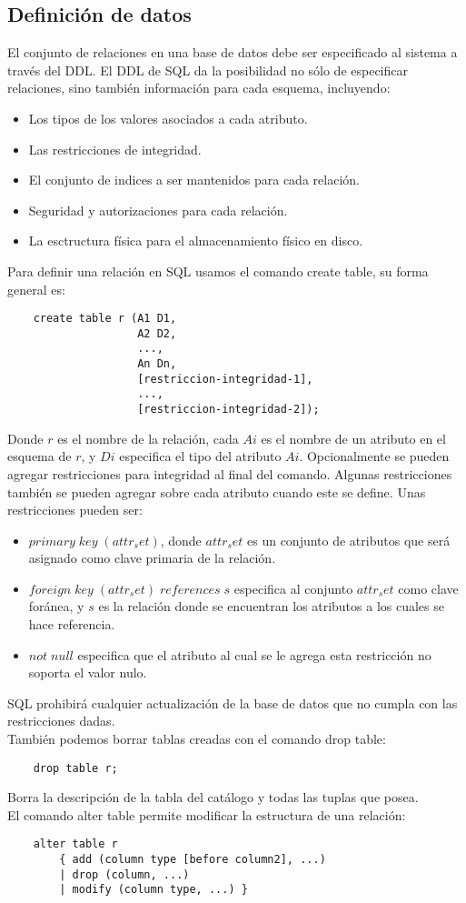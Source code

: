 \documentclass[a4paper]{article}
\begin{document}
\subsection{Definici\'on de datos}
El conjunto de relaciones en una base de datos debe ser especificado al sistema a trav\'es del
DDL. El DDL de SQL da la posibilidad no s\'olo de especificar relaciones, sino tambi\'en
informaci\'on para cada esquema, incluyendo:
\begin{itemize}
    \item Los tipos de los valores asociados a cada atributo.
    \item Las restricciones de integridad.
    \item El conjunto de indices a ser mantenidos para cada relaci\'on.
    \item Seguridad y autorizaciones para cada relaci\'on.
    \item La esctructura f\'isica para el almacenamiento f\'isico en disco.
\end{itemize}
Para definir una relaci\'on en SQL usamos el comando create table, su forma general es:
\begin{lstlisting}
    create table r (A1 D1,
                    A2 D2,
                    ...,
                    An Dn,
                    [restriccion-integridad-1],
                    ...,
                    [restriccion-integridad-2]);
\end{lstlisting}
Donde $r$ es el nombre de la relaci\'on, cada $Ai$ es el nombre de un atributo en el esquema 
de $r$, y $Di$ especifica el tipo del atributo $Ai$. Opcionalmente se pueden agregar
restricciones para integridad al final del comando. Algunas restricciones tambi\'en se pueden
agregar sobre cada atributo cuando este se define. Unas restricciones pueden ser:
\begin{itemize}
    \item $primary\; key\; (attr_set)$, donde $attr_set$ es un conjunto de atributos que ser\'a
    asignado como clave primaria de la relaci\'on.
    \item $foreign\; key\; (attr_set)\; references\; s$ especifica al conjunto $attr_set$ como
    clave foránea, y $s$ es la relaci\'on donde se encuentran los atributos a los cuales se
    hace referencia.
    \item $not\; null$ especifica que el atributo al cual se le agrega esta restricci\'on no
    soporta el valor nulo.
\end{itemize}
SQL prohibirá cualquier actualización de la base de datos que no cumpla con las restricciones
dadas. \\
También podemos borrar tablas creadas con el comando drop table:
\begin{lstlisting}
    drop table r;
\end{lstlisting}
Borra la descripción de la tabla del catálogo y todas las tuplas que posea. \\
El comando alter table permite modificar la estructura de una relación:
\begin{lstlisting}
    alter table r
        { add (column type [before column2], ...)
        | drop (column, ...)
        | modify (column type, ...) }
\end{lstlisting}
\end{document}
